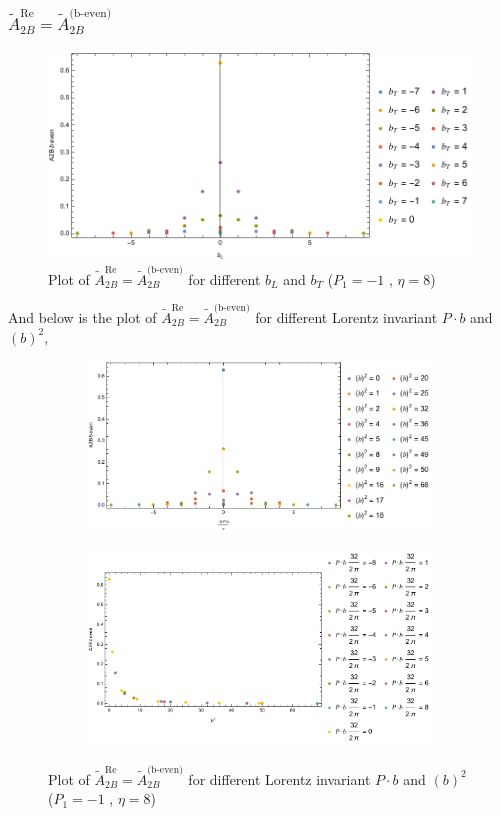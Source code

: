 \documentclass[]{article}
\numberwithin{equation}{section}
\newcommand{\tAmp}{\widetilde{A}}
\newcommand{\tAmp}{\ensuremath{\widetilde{A}^{(+)}}}
\begin{document}
\subsubsection{$\tAmp^{\text{Re}}_{2B}=\tAmp^{\text{(b-even)}}_{2B}$}
\begin{figure}[h!]
    \centering
    \includegraphics[width=0.45\linewidth]{bLbT_A2B_b_even_P1_-1_eta_8.pdf}
    \caption{Plot of  $\tAmp^{\text{Re}}_{2B}=\tAmp^{\text{(b-even)}}_{2B}$ for different $b_{L}$ and $b_{T}$  ($P_{1} = -1$ , $\eta=8$)}
\end{figure}

And below is the plot of $\tAmp^{\text{Re}}_{2B}=\tAmp^{\text{(b-even)}}_{2B}$ for different Lorentz invariant $P\cdot b$ and $(b)^2$,
\begin{figure}[h!]
     \centering
     \begin{subfigure}[b]{0.45\textwidth}
         \centering
         \includegraphics[width=\textwidth]{bP_A2B_b_even_P1_-1_eta_8.pdf}
     \end{subfigure}
     \begin{subfigure}[b]{0.45\textwidth}
         \centering
         \includegraphics[width=\textwidth]{bsq_A2B_b_even_P1_-1_eta_8.pdf}
     \end{subfigure}
        \caption{Plot of $\tAmp^{\text{Re}}_{2B}=\tAmp^{\text{(b-even)}}_{2B}$ for different Lorentz invariant $P\cdot b$ and $(b)^2$  ($P_{1} = -1$ , $\eta=8$)}
\end{figure}
\end{document}
